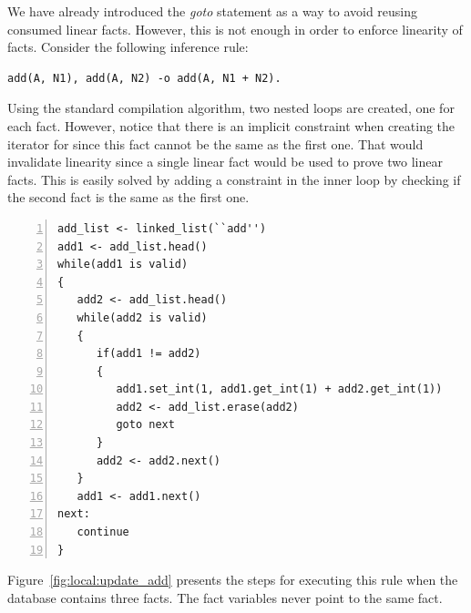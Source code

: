 We have already introduced the \emph{goto} statement as a way to avoid reusing
consumed linear facts. However, this is not enough in order to enforce
linearity of facts. Consider the following inference rule:

\begin{Verbatim}[fontsize=\codesize]
add(A, N1), add(A, N2) -o add(A, N1 + N2).
\end{Verbatim}

Using the standard compilation algorithm, two nested loops are created, one for
each  fact. However, notice that there is an implicit constraint when
creating the iterator for  since this fact cannot be the same
as the first one. That would invalidate linearity since a single linear fact
would be used to prove two linear facts. This is easily solved by adding a
constraint in the inner loop by checking if the second fact is the same as the
first one.

\begin{Verbatim}[numbers=left,fontsize=\codesize]
add_list <- linked_list(``add'')
add1 <- add_list.head()
while(add1 is valid)
{
   add2 <- add_list.head()
   while(add2 is valid)
   {
      if(add1 != add2)
      {
         add1.set_int(1, add1.get_int(1) + add2.get_int(1))
         add2 <- add_list.erase(add2)
         goto next
      }
      add2 <- add2.next()
   }
   add1 <- add1.next()
next:
   continue
}
\end{Verbatim}

Figure~\ref{fig:local:update_add} presents the steps for executing this rule
when the database contains three facts. The fact variables never point to the
same fact.

